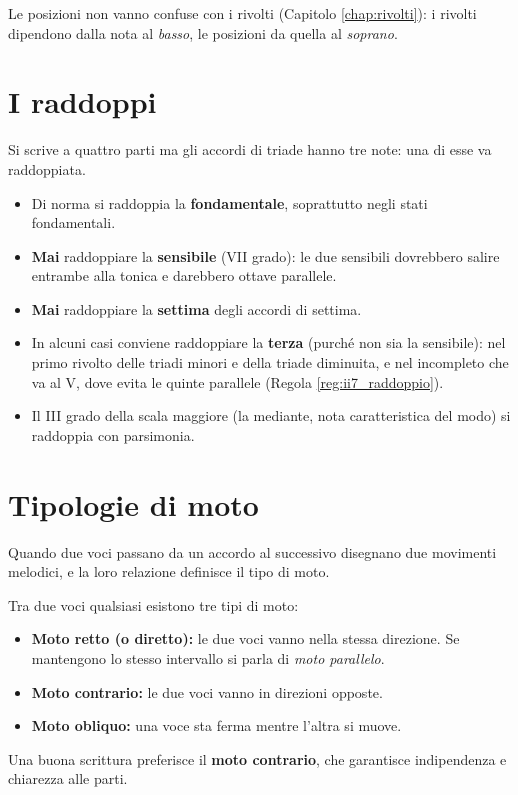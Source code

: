 Le posizioni non vanno confuse con i rivolti (Capitolo \ref{chap:rivolti}): i rivolti dipendono dalla nota al \textit{basso}, le posizioni da quella al \textit{soprano}.

\section{I raddoppi}
\label{sec:raddoppi}

Si scrive a quattro parti ma gli accordi di triade hanno tre note: una di esse va raddoppiata.

\begin{regola}
	\label{reg:raddoppi}
	\begin{itemize}
		\item Di norma si raddoppia la \textbf{fondamentale}, soprattutto negli stati fondamentali.
		\item \textbf{Mai} raddoppiare la \textbf{sensibile} (VII grado): le due sensibili dovrebbero salire entrambe alla tonica e darebbero ottave parallele.
		\item \textbf{Mai} raddoppiare la \textbf{settima} degli accordi di settima.
		\item In alcuni casi conviene raddoppiare la \textbf{terza} (purché non sia la sensibile): nel primo rivolto delle triadi minori e della triade diminuita, e nel  incompleto che va al V, dove evita le quinte parallele (Regola \ref{reg:ii7_raddoppio}).
		\item Il III grado della scala maggiore (la mediante, nota caratteristica del modo) si raddoppia con parsimonia.
	\end{itemize}
\end{regola}

\section{Tipologie di moto}
\label{sec:tipologie_moto}

Quando due voci passano da un accordo al successivo disegnano due movimenti melodici, e la loro relazione definisce il tipo di moto.

\begin{definizione}
	\label{def:tipi_moto}
	Tra due voci qualsiasi esistono tre tipi di moto:
	\begin{itemize}
		\item \textbf{Moto retto (o diretto):} le due voci vanno nella stessa direzione. Se mantengono lo stesso intervallo si parla di \textit{moto parallelo}.
		\item \textbf{Moto contrario:} le due voci vanno in direzioni opposte.
		\item \textbf{Moto obliquo:} una voce sta ferma mentre l'altra si muove.
	\end{itemize}
\end{definizione}

Una buona scrittura preferisce il \textbf{moto contrario}, che garantisce indipendenza e chiarezza alle parti.
